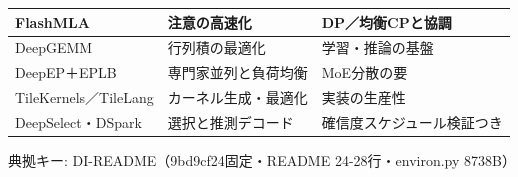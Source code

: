 \documentclass[lualatex,a4paper,10pt]{jlreq}
\begin{document}
{\centering\footnotesize
{}
\begin{tabularx}{0.96\linewidth}{@{}lXX@{}}
\toprule
FlashMLA & 注意の高速化 & DP／均衡CPと協調 \\
\midrule
DeepGEMM & 行列積の最適化 & 学習・推論の基盤 \\
DeepEP＋EPLB & 専門家並列と負荷均衡 & MoE分散の要 \\
TileKernels／TileLang & カーネル生成・最適化 & 実装の生産性 \\
DeepSelect・DSpark & 選択と推測デコード & 確信度スケジュール検証つき \\
\bottomrule
\end{tabularx}
{\scriptsize\color{SurveyMuted} 典拠キー: DI-README（9bd9cf24固定・README 24-28行・environ.py 8738B）\par}
} %
\end{document}
